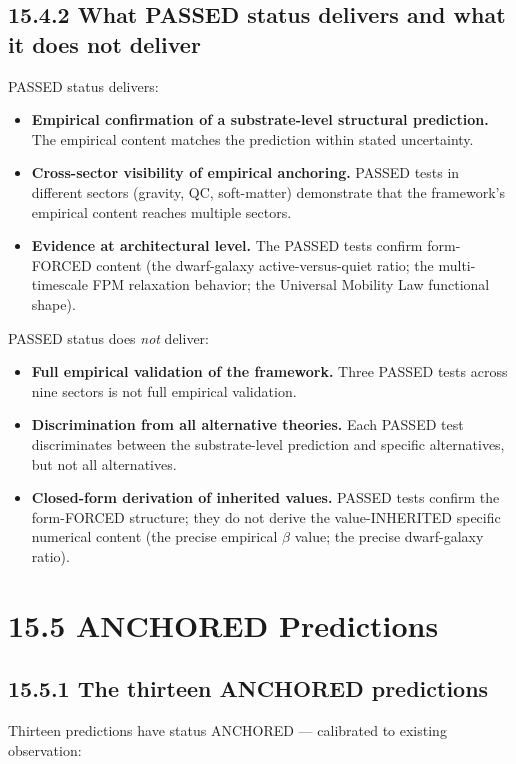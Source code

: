 \documentclass[11pt]{book}
\begin{document}
\subsection{15.4.2 What PASSED status delivers and what it does not deliver}

PASSED status delivers:
\begin{itemize}
\item \textbf{Empirical confirmation of a substrate-level structural prediction.} The empirical content matches the prediction within stated uncertainty.
\item \textbf{Cross-sector visibility of empirical anchoring.} PASSED tests in different sectors (gravity, QC, soft-matter) demonstrate that the framework's empirical content reaches multiple sectors.
\item \textbf{Evidence at architectural level.} The PASSED tests confirm form-FORCED content (the dwarf-galaxy active-versus-quiet ratio; the multi-timescale FPM relaxation behavior; the Universal Mobility Law functional shape).
\end{itemize}

PASSED status does \textit{not} deliver:
\begin{itemize}
\item \textbf{Full empirical validation of the framework.} Three PASSED tests across nine sectors is not full empirical validation.
\item \textbf{Discrimination from all alternative theories.} Each PASSED test discriminates between the substrate-level prediction and specific alternatives, but not all alternatives.
\item \textbf{Closed-form derivation of inherited values.} PASSED tests confirm the form-FORCED structure; they do not derive the value-INHERITED specific numerical content (the precise empirical $\beta$ value; the precise dwarf-galaxy ratio).
\end{itemize}

\section{15.5 ANCHORED Predictions}

\subsection{15.5.1 The thirteen ANCHORED predictions}

Thirteen predictions have status ANCHORED — calibrated to existing observation:
\end{document}
